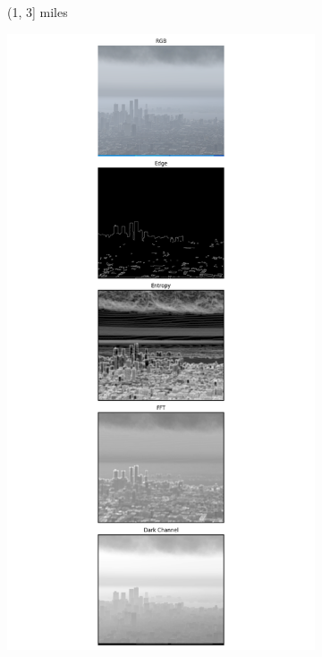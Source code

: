 \begin{figure}
\begin{subfigure}[b]{0.15\textwidth}
      \caption{(1, 3] miles}
      \label{subfig:bin2}
    \end{subfigure}
    \begin{subfigure}[b]{0.15\textwidth}
      \includegraphics[width=\textwidth, trim={7.5cm 0 7.5cm 0},clip]{imgs/examples/exp_0_featuresMiles_4.038922788223744_featuresM_6500_features.png}

\end{subfigure}
\end{figure}
